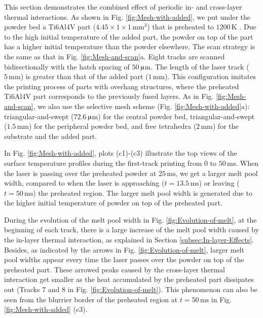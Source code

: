 \documentclass [11pt, proquest] {uwthesis}[2020/02/24]
\begin{document}
This section demonstrates the combined effect of periodic in- and
cross-layer thermal interactions. As shown in Fig. \ref{fig:Mesh-with-added},
we put under the powder bed a Ti6Al4V part ($4.45\times1\times1\,\text{mm}^{3}$)
that is preheated to $1200\,\text{K}$ \cite{liu2019additive}. Due
to the high initial temperature of the added part, the powder on top
of the part has a higher initial temperature than the powder elsewhere.
The scan strategy is the same as that in Fig. \ref{fig:Mesh-and-scan}a.
Eight tracks are scanned bidirectionally with the hatch spacing of
$50\,$$\muup$m. The length of the laser track ($5\,\text{mm}$)
is greater than that of the added part ($1\,\text{mm}$). This configuration
imitates the printing process of parts with overhang structures, where
the preheated Ti6Al4V part corresponds to the previously fused layers.
As in Fig. \ref{fig:Mesh-and-scan}, we also use the selective mesh
scheme (Fig. \ref{fig:Mesh-with-added}a): triangular-and-swept ($72.6\,$$\muup$m)
for the central powder bed, triangular-and-swept ($1.5\,\text{mm}$)
for the peripheral powder bed, and free tetrahedra ($2\,\text{mm}$)
for the substrate and the added part.

In Fig. \ref{fig:Mesh-with-added}, plots (c1)-(c3) illustrate the
top views of the surface temperature profiles during the first-track
printing from 0 to $50\,\text{ms}$. When the laser is passing over
the preheated powder at $25\,\text{ms}$, we get a larger melt pool
width, compared to when the laser is approaching ($t=13.5\,\text{ms}$)
or leaving ($t=50\,\text{ms}$) the preheated region. The larger melt
pool width is generated due to the higher initial temperature of powder
on top of the preheated part.

During the evolution of the melt pool width in Fig. \ref{fig:Evolution-of-melt},
at the beginning of each track, there is a large increase of the melt
pool width caused by the in-layer thermal interaction, as explained
in Section \ref{subsec:In-layer-Effects}. Besides, as indicated
by the arrows in Fig. \ref{fig:Evolution-of-melt}, larger melt pool
widths appear every time the laser passes over the powder on top of
the preheated part. These arrowed peaks caused by the cross-layer
thermal interaction get smaller as the heat accumulated by the preheated
part dissipates out (Tracks 7 and 8 in Fig. \ref{fig:Evolution-of-melt}).
This phenomenon can also be seen from the blurrier border of the preheated
region at $t=50\,\text{ms}$ in Fig. \ref{fig:Mesh-with-added} (c3).
\end{document}
